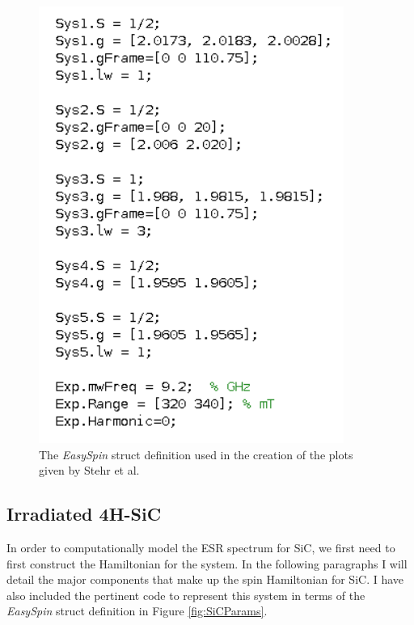 \documentclass[oneside, noacknowlegments]{BYUPhys}
\begin{document}
\begin{figure}[h]
    \centerline{\includegraphics{stehr_code_fig}}
    \caption[The \textit{EasySpin} Representation of ZnO Nanowires]{\label{fig:StehrCode}
     The \textit{EasySpin} struct definition used in the creation of the plots given by Stehr et al.}
 \end{figure}

\subsection{Irradiated 4H-SiC}

In order to computationally model the ESR spectrum for SiC, we first need to first construct the Hamiltonian for the system. In the following paragraphs I will detail the major components that make up the spin Hamiltonian for SiC. I have also included the pertinent code to represent this system in terms of the \textit{EasySpin} struct definition in Figure \ref{fig:SiCParams}.
\end{document}
